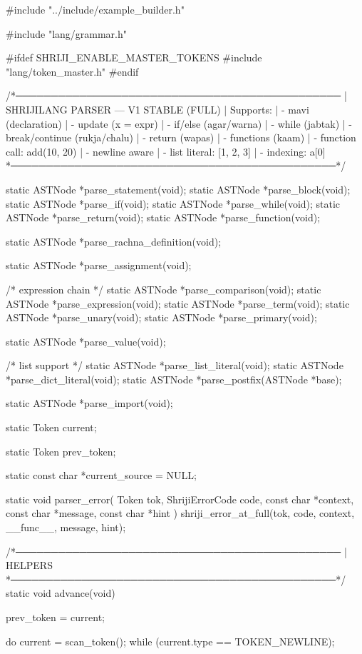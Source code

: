 \documentclass{article}
\begin{document}
#include "../include/example_builder.h"

#include "lang/grammar.h"

#ifdef SHRIJI_ENABLE_MASTER_TOKENS
#include "lang/token_master.h"
#endif



/*──────────────────────────────────────────────
 | SHRIJILANG PARSER — V1 STABLE (FULL)
 | Supports:
 |   - mavi (declaration)
 |   - update (x = expr)
 |   - if/else (agar/warna)
 |   - while (jabtak)
 |   - break/continue (rukja/chalu)
 |   - return (wapas)
 |   - functions (kaam)
 |   - function call: add(10, 20)
 |   - newline aware
 |   - list literal: [1, 2, 3]
 |   - indexing: a[0]
 *──────────────────────────────────────────────*/




static ASTNode *parse_statement(void);
static ASTNode *parse_block(void);
static ASTNode *parse_if(void);
static ASTNode *parse_while(void);
static ASTNode *parse_return(void);
static ASTNode *parse_function(void);

static ASTNode *parse_rachna_definition(void);

static ASTNode *parse_assignment(void);

/* expression chain */
static ASTNode *parse_comparison(void);
static ASTNode *parse_expression(void);
static ASTNode *parse_term(void);
static ASTNode *parse_unary(void);
static ASTNode *parse_primary(void);

static ASTNode *parse_value(void);

/* list support */
static ASTNode *parse_list_literal(void);
static ASTNode *parse_dict_literal(void);
static ASTNode *parse_postfix(ASTNode *base);

static ASTNode *parse_import(void);

static Token current;

static Token prev_token;

static const char *current_source = NULL;

static void parser_error(
    Token tok,
    ShrijiErrorCode code,
    const char *context,
    const char *message,
    const char *hint
)
{
    shriji_error_at_full(tok, code, context, __func__, message, hint);
}







/*──────────────────────────────────────────────
 | HELPERS
 *──────────────────────────────────────────────*/
static void advance(void)
{
    prev_token = current;

    do {
        current = scan_token();
    } while (current.type == TOKEN_NEWLINE);
}
\end{document}
